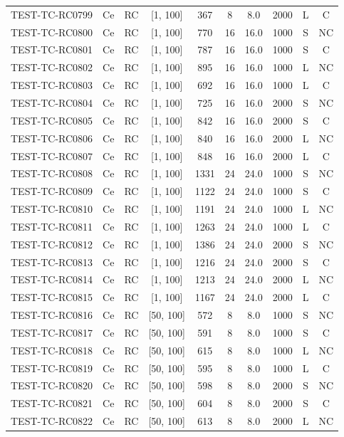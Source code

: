 \begin{longtable}{lccccccccc}
TEST-TC-RC0799 & Ce & RC & [1, 100] & 367 & 8 & 8.0 & 2000 & L & C \\
TEST-TC-RC0800 & Ce & RC & [1, 100] & 770 & 16 & 16.0 & 1000 & S & NC \\
TEST-TC-RC0801 & Ce & RC & [1, 100] & 787 & 16 & 16.0 & 1000 & S & C \\
TEST-TC-RC0802 & Ce & RC & [1, 100] & 895 & 16 & 16.0 & 1000 & L & NC \\
TEST-TC-RC0803 & Ce & RC & [1, 100] & 692 & 16 & 16.0 & 1000 & L & C \\
TEST-TC-RC0804 & Ce & RC & [1, 100] & 725 & 16 & 16.0 & 2000 & S & NC \\
TEST-TC-RC0805 & Ce & RC & [1, 100] & 842 & 16 & 16.0 & 2000 & S & C \\
TEST-TC-RC0806 & Ce & RC & [1, 100] & 840 & 16 & 16.0 & 2000 & L & NC \\
TEST-TC-RC0807 & Ce & RC & [1, 100] & 848 & 16 & 16.0 & 2000 & L & C \\
TEST-TC-RC0808 & Ce & RC & [1, 100] & 1331 & 24 & 24.0 & 1000 & S & NC \\
TEST-TC-RC0809 & Ce & RC & [1, 100] & 1122 & 24 & 24.0 & 1000 & S & C \\
TEST-TC-RC0810 & Ce & RC & [1, 100] & 1191 & 24 & 24.0 & 1000 & L & NC \\
TEST-TC-RC0811 & Ce & RC & [1, 100] & 1263 & 24 & 24.0 & 1000 & L & C \\
TEST-TC-RC0812 & Ce & RC & [1, 100] & 1386 & 24 & 24.0 & 2000 & S & NC \\
TEST-TC-RC0813 & Ce & RC & [1, 100] & 1216 & 24 & 24.0 & 2000 & S & C \\
TEST-TC-RC0814 & Ce & RC & [1, 100] & 1213 & 24 & 24.0 & 2000 & L & NC \\
TEST-TC-RC0815 & Ce & RC & [1, 100] & 1167 & 24 & 24.0 & 2000 & L & C \\
TEST-TC-RC0816 & Ce & RC & [50, 100] & 572 & 8 & 8.0 & 1000 & S & NC \\
TEST-TC-RC0817 & Ce & RC & [50, 100] & 591 & 8 & 8.0 & 1000 & S & C \\
TEST-TC-RC0818 & Ce & RC & [50, 100] & 615 & 8 & 8.0 & 1000 & L & NC \\
TEST-TC-RC0819 & Ce & RC & [50, 100] & 595 & 8 & 8.0 & 1000 & L & C \\
TEST-TC-RC0820 & Ce & RC & [50, 100] & 598 & 8 & 8.0 & 2000 & S & NC \\
TEST-TC-RC0821 & Ce & RC & [50, 100] & 604 & 8 & 8.0 & 2000 & S & C \\
TEST-TC-RC0822 & Ce & RC & [50, 100] & 613 & 8 & 8.0 & 2000 & L & NC \\

\end{longtable}
